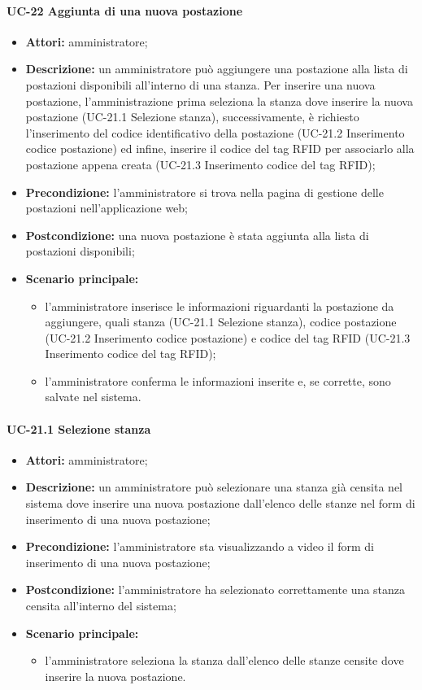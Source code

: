 \paragraph{UC-22 Aggiunta di una nuova postazione}
\begin{itemize}
    \item \textbf{Attori:} amministratore;
    \item \textbf{Descrizione:} un amministratore pu\`{o} aggiungere una postazione alla lista di postazioni disponibili all'interno di una stanza. Per inserire una nuova postazione, l'amministrazione prima seleziona la stanza dove inserire la nuova postazione (UC-21.1 Selezione stanza), successivamente, è richiesto l'inserimento del codice identificativo della postazione (UC-21.2 Inserimento codice postazione) ed infine, inserire il codice del tag RFID per associarlo alla postazione appena creata (UC-21.3 Inserimento codice del tag RFID);
    \item \textbf{Precondizione:} l'amministratore si trova nella pagina di gestione delle postazioni nell'applicazione web;
    \item \textbf{Postcondizione:} una nuova postazione \`{e} stata aggiunta alla lista di postazioni disponibili;
    \item \textbf{Scenario principale:}
    \begin{itemize}
        \item l'amministratore inserisce le informazioni riguardanti la postazione da aggiungere, quali stanza (UC-21.1 Selezione stanza), codice postazione (UC-21.2 Inserimento codice postazione) e codice del tag RFID (UC-21.3 Inserimento codice del tag RFID);
        \item l'amministratore conferma le informazioni inserite e, se corrette, sono salvate nel sistema.
    \end{itemize}
\end{itemize}


\paragraph{UC-21.1 Selezione stanza}
\begin{itemize}
    \item \textbf{Attori:} amministratore;
    \item \textbf{Descrizione:} un amministratore pu\`{o} selezionare una stanza già censita nel sistema dove inserire una nuova postazione dall'elenco delle stanze nel form di inserimento di una nuova postazione;
    \item \textbf{Precondizione:} l'amministratore sta visualizzando a video il form di inserimento di una nuova postazione;
    \item \textbf{Postcondizione:} l'amministratore ha selezionato correttamente una stanza censita all'interno del sistema;
    \item \textbf{Scenario principale:}
    \begin{itemize}
        \item l'amministratore seleziona la stanza dall'elenco delle stanze censite dove inserire la nuova postazione.
    \end{itemize}
\end{itemize}


